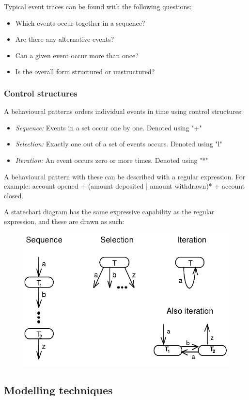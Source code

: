 \noindent Typical event traces can be found with the following questions:
\begin{itemize}
    \item Which events occur together in a sequence?
    \item Are there any alternative events?
    \item Can a given event occur more than once?
    \item Is the overall form structured or unstructured?
\end{itemize}


\subsubsection{Control structures}

A behavioural patterns orders individual events in time using control structures:

\begin{itemize}
    \item \textit{Sequence:} Events in a set occur one by one. Denoted using "+"
    \item \textit{Selection:} Exactly one out of a set of events occurs. Denoted using "l"
    \item \textit{Iteration:} An event occurs zero or more times. Denoted using "*"
\end{itemize}

A behavioural pattern with these can be described with a regular expression. For example: account opened + (amount deposited | amount withdrawn)* + account closed.

A statechart diagram has the same expressive capability as the regular expression, and these are drawn as such:

\begin{figure}[H]
    \centering
    \includegraphics[width=.5\textwidth]{figures/behaviouralcontrol.png}
\end{figure}

\subsection{Modelling techniques}
